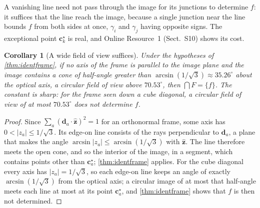 \documentclass[pdflatex,sn-mathphys-num,iicol]{sn-jnl}
\newcommand{\vd}{\mathbf{d}}
\newcommand{\vc}{\mathbf{c}}
\newcommand{\OR}{Online Resource~1}
\theoremstyle{thmstyleone}
\newtheorem{corollary}[theorem]{Corollary}
\theoremstyle{thmstylethree}
\theoremstyle{thmstyletwo}
\begin{document}
A vanishing line need not pass through the image for its junctions to determine $f$: it suffices that the line reach the image, because a single junction near the line bounds $f$ from both sides at once, $\gamma_i$ and $\gamma_j$ having opposite signs. The exceptional point $\vc^{\star}_k$ is real, and \OR{} (Sect.~S10) shows its cost.

\begin{corollary}[A wide field of view suffices]\label{cor:wide}
Under the hypotheses of \cref{thm:identframe}, if no axis of the frame is parallel to the image plane and the image contains a cone of half-angle greater than $\arcsin(1/\sqrt3)\approx35.26^\circ$ about the optical axis, a circular field of view above $70.53^\circ$, then $\bigcap F=\{f\}$. The constant is sharp: for the frame seen down a cube diagonal, a circular field of view of at most $70.53^\circ$ does not determine $f$.
\end{corollary}
\begin{proof}
Since $\sum_a(\vd_a\cdot\hat{\mathbf z})^2=1$ for an orthonormal frame, some axis has $0<|z_a|\le1/\sqrt3$. Its edge-on line consists of the rays perpendicular to $\vd_a$, a plane that makes the angle $\arcsin|z_a|\le\arcsin(1/\sqrt3)$ with $\hat{\mathbf z}$. The line therefore meets the open cone, and so the interior of the image, in a segment, which contains points other than $\vc^{\star}_a$; \cref{thm:identframe} applies. For the cube diagonal every axis has $|z_a|=1/\sqrt3$, so each edge-on line keeps an angle of exactly $\arcsin(1/\sqrt3)$ from the optical axis; a circular image of at most that half-angle meets each line at most at its point $\vc^{\star}_a$, and \cref{thm:identframe} shows that $f$ is then not determined.
\end{proof}
\end{document}

